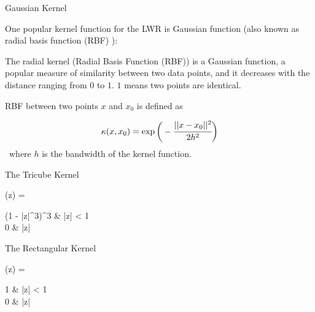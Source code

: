 \documentclass[aspectratio=169,xcolor=dvipsnames,svgnames,x11names,fleqn]{beamer}
\begin{document}
    \begin{frame}{Gaussian Kernel}

        One popular kernel function for the LWR is Gaussian function (also known as radial basis function (RBF) ):
    
        The radial kernel (Radial Basis Function (RBF)) is a Gaussian function, a popular measure of similarity between two data points, and it decreases with the distance ranging from $0$ to $1$.
    $1$ means two points are identical.
    
    RBF between two points $x$ and $x_0$ is defined as
    
    $$
    \kappa(x, x_0) = \exp\bigg( -\cfrac{||x-x_0||^2}{2h^2} \bigg)
    $$\
    where $h$ is the bandwidth of the kernel function.
    \end{frame}
    
    \begin{frame}{The Tricube Kernel}

        \begin{tblock}{}
            
            \begin{multiequation}
                \kappa(z) = \begin{cases}
                    (1  - |z|^3)^3 & \quad |z|  < 1\\
                    0 & \quad |z| 
                \end{cases}
            \end{multiequation}

        \end{tblock}
        
    \end{frame}

    \begin{frame}{The Rectangular Kernel}

        \begin{tblock}{}
            
            \begin{multiequation}
                \kappa(z) = \begin{cases}
                    1 & \quad |z|  < 1\\
                    0 & \quad |z| 
                \end{cases}
            \end{multiequation}

        \end{tblock}
        
    \end{frame}
\end{document}
